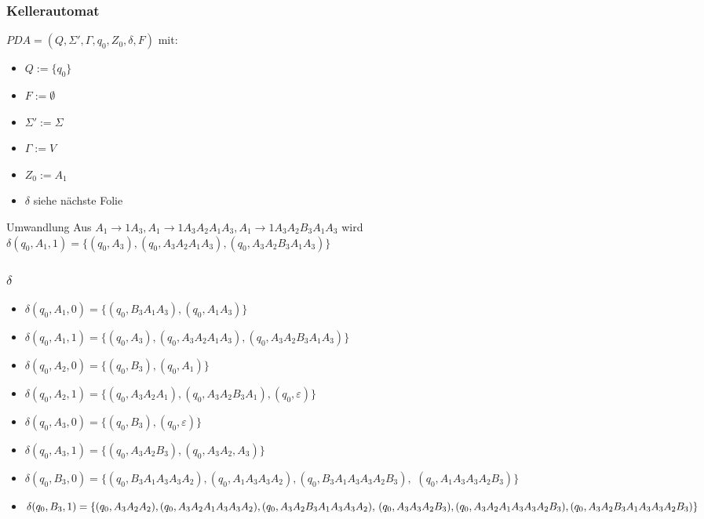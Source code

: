 \begin{frame}
 \frametitle{Kellerautomat}
\(PDA = (Q, \Sigma', \Gamma, q_0, Z_0, \delta, F)\) mit:
 \begin{itemize}
  \item $Q := \{q_0\}$
  \item $F := \emptyset$
  \item $\Sigma' := \Sigma$
  \item $\Gamma := V$
  \item $Z_0 := A_1$
  \item $\delta$ siehe nächste Folie
 \end{itemize}
 \begin{block}{Umwandlung}
 Aus \(A_1 \rightarrow 1A_3, A_1 \rightarrow 1A_3A_2A_1A_3, A_1 \rightarrow 1A_3A_2B_3A_1A_3\)
 wird \(\delta(q_0, A_1, 1) = \{(q_0, A_3), (q_0, A_3A_2A_1A_3), (q_0, A_3A_2B_3A_1A_3) \}\)
 \end{block}
\end{frame}

\begin{frame}
 \frametitle{$\delta$}
\begin{itemize}
 \item \(\delta(q_0, A_1, 0) = \{ (q_0, B_3A_1A_3), (q_0, A_1A_3)\}\)
 \item \(\delta(q_0, A_1, 1) = \{(q_0, A_3), (q_0, A_3A_2A_1A_3), (q_0, A_3A_2B_3A_1A_3) \}\)
 \item \(\delta(q_0, A_2, 0) = \{(q_0, B_3), (q_0, A_1)\}\)
 \item \(\delta(q_0, A_2, 1) = \{(q_0, A_3A_2A_1), (q_0, A_3A_2B_3A_1), (q_0, \varepsilon)\}\)
 \item \(\delta(q_0, A_3, 0) = \{(q_0, B_3), (q_0, \varepsilon)\}\)
 \item \(\delta(q_0, A_3, 1) = \{(q_0, A_3A_2B_3), (q_0, A_3A_2, A_3)\}\)
 \item $\delta(q_0, B_3, 0) = \{(q_0, B_3A_1A_3A_3A_2), (q_0, A_1A_3A_3A_2), (q_0, B_3A_1A_3A_3A_2B_3),$ $ (q_0, A_1A_3A_3A_2B_3)\}$
 \item \(\delta(q_0, B_3, 1) = \{(q_0, A_3A_2A_2), (q_0, A_3A_2A_1A_3A_3A_2), (q_0, A_3A_2B_3A_1A_3A_3A_2),$ $
 (q_0, A_3A_3A_2B_3), (q_0, A_3A_2A_1A_3A_3A_2B_3), (q_0, A_3A_2B_3A_1A_3A_3A_2B_3)\}\)
\end{itemize}
\end{frame}

